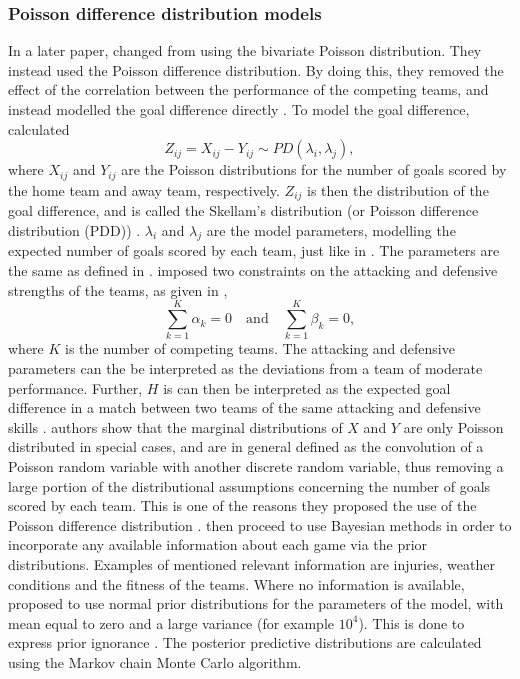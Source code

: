 \subsubsection{Poisson difference distribution models}

In a later paper, \citet{bib:karlis-ntzoufras-2008} changed from using the bivariate Poisson distribution. They instead used the Poisson difference distribution. By doing this, they removed the effect of the correlation between the performance of the competing teams, and instead modelled the goal difference directly \citep{bib:karlis-ntzoufras-2008}. To model the goal difference, \citet{bib:karlis-ntzoufras-2008} calculated
\begin{equation*}
    Z_{ij} = X_{ij} - Y_{ij} \sim PD(\lambda_{i}, \lambda_{j}),
\end{equation*}
where $X_{ij}$ and $Y_{ij}$ are the Poisson distributions for the number of goals scored by the home team and away team, respectively. $Z_{ij}$ is then the distribution of the goal difference, and is called the Skellam's distribution (or Poisson difference distribution (PDD)) \citep{bib:karlis-ntzoufras-2008}. $\lambda_{i}$ and $\lambda_{j}$ are the model parameters, modelling the expected number of goals scored by each team, just like in \citet{bib:karlis-ntzoufras-2003}. The parameters are the same as defined in . \citet{bib:karlis-ntzoufras-2008} imposed two constraints on the attacking and defensive strengths of the teams, as given in ,
\begin{equation}
    \sum_{k=1}^{K} \alpha_{k} = 0 \quad \text{and} \quad \sum_{k=1}^{K} \beta_{k} = 0,
    \label{eq:karlis-ntzoufras-constraints}
\end{equation}
where $K$ is the number of competing teams. The attacking and defensive parameters can the be interpreted as the deviations from a team of moderate performance. Further, $H$ is can then be interpreted as the expected goal difference in a match between two teams of the same attacking and defensive skills \citep{bib:karlis-ntzoufras-2008}. \citet{bib:karlis-ntzoufras-2008} authors show that the marginal distributions of $X$ and $Y$ are only Poisson distributed in special cases, and are in general defined as the convolution of a Poisson random variable with another discrete random variable, thus removing a large portion of the distributional assumptions concerning the number of goals scored by each team. This is one of the reasons they proposed the use of the Poisson difference distribution \citep{bib:karlis-ntzoufras-2008}. \citet{bib:karlis-ntzoufras-2008} then proceed to use Bayesian methods in order to incorporate any available information about each game via the prior distributions. Examples of mentioned relevant information are injuries, weather conditions and the fitness of the teams. Where no information is available, \citet{bib:karlis-ntzoufras-2008} proposed to use normal prior distributions for the parameters of the model, with mean equal to zero and a large variance (for example $10^4$). This is done to express prior ignorance \citep{bib:karlis-ntzoufras-2008}. The posterior predictive distributions are calculated using the Markov chain Monte Carlo algorithm.

